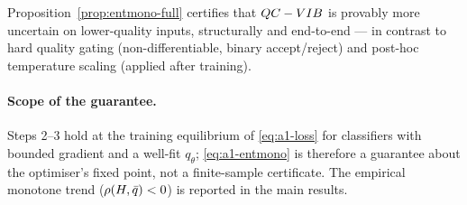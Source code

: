 \begin{remark}\label{rem:a1-calib}
Proposition~\ref{prop:entmono-full} certifies that $QC-VIB$ is provably more uncertain on lower-quality
inputs, structurally and end-to-end --- in contrast to hard quality gating (non-differentiable,
binary accept/reject) and post-hoc temperature scaling (applied after training).
\end{remark}

\paragraph{Scope of the guarantee.}
Steps 2--3 hold at the training equilibrium of \eqref{eq:a1-loss} for classifiers with bounded
gradient and a well-fit $q_\theta$; \eqref{eq:a1-entmono} is therefore a guarantee about the
optimiser's fixed point, not a finite-sample certificate. The empirical monotone trend
($\rho(H,\bar{q})<0$) is reported in the main results.
